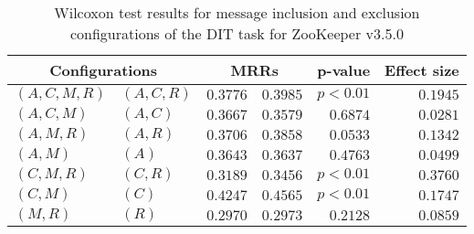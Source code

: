 
\begin{table}
\begin{spacing}{1.2}
\centering
\caption{Wilcoxon test results for message inclusion and exclusion configurations of the DIT task for ZooKeeper v3.5.0}
\label{table:versus-wilcox-zookeeper-dit-message}
\begin{tabular}{ll|rr|rr}
\toprule
      \multicolumn{2}{c|}{Configurations} &          \multicolumn{2}{c|}{MRRs} &       p-value & Effect size \\
\midrule
 $(A,C,M,R)$ &  $(A,C,R)$ & $0.3776$ & $0.3985$ & $p<0.01$ &    $0.1945$ \\
   $(A,C,M)$ &    $(A,C)$ & $0.3667$ & $0.3579$ & $0.6874$ &    $0.0281$ \\
   $(A,M,R)$ &    $(A,R)$ & $0.3706$ & $0.3858$ & $0.0533$ &    $0.1342$ \\
     $(A,M)$ &      $(A)$ & $0.3643$ & $0.3637$ & $0.4763$ &    $0.0499$ \\
   $(C,M,R)$ &    $(C,R)$ & $0.3189$ & $0.3456$ & $p<0.01$ &    $0.3760$ \\
     $(C,M)$ &      $(C)$ & $0.4247$ & $0.4565$ & $p<0.01$ &    $0.1747$ \\
     $(M,R)$ &      $(R)$ & $0.2970$ & $0.2973$ & $0.2128$ &    $0.0859$ \\
\bottomrule
\end{tabular}

\end{spacing}
\end{table}

